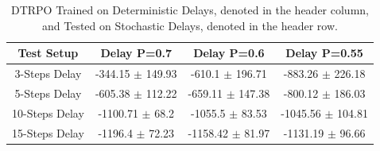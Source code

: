             \begin{table}[!b]
                \centering
                \caption{DTRPO Trained on Deterministic Delays, denoted in the header column, and Tested on Deterministic Delays, denoted in the header row.}
            \end{table}
            
            \begin{table}[!b]
                \centering
                \begin{tabular}{@{}cccc@{}}
                \toprule
                \multicolumn{1}{c}{Test Setup} & Delay P=0.7           & Delay P=0.6            & Delay P=0.55          \\ \midrule
                3-Steps Delay                  & -344.15 $\pm$ 149.93  & -610.1 $\pm$ 196.71    & -883.26 $\pm$ 226.18  \\
                5-Steps Delay                  & -605.38 $\pm$ 112.22  & -659.11 $\pm$ 147.38   & -800.12 $\pm$ 186.03  \\
                10-Steps Delay                 & -1100.71 $\pm$ 68.2   & -1055.5 $\pm$ 83.53    & -1045.56 $\pm$ 104.81 \\
                15-Steps Delay                 & -1196.4 $\pm$ 72.23   & -1158.42 $\pm$ 81.97   & -1131.19 $\pm$ 96.66  \\ \bottomrule
                \end{tabular}
                \centering
                \caption{DTRPO Trained on Deterministic Delays, denoted in the header column, and Tested on Stochastic Delays, denoted in the header row.}
            \end{table}
            

